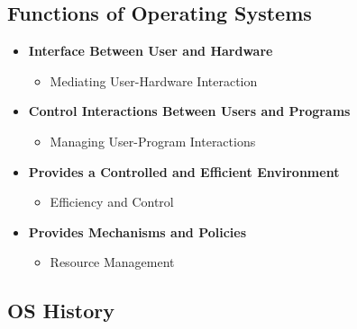 \documentclass[11pt]{article}
\theoremstyle{definition}
\begin{document}
\subsection{Functions of Operating Systems}
    \begin{itemize}
        \item \textbf{Interface Between User and Hardware}
        \begin{itemize}
            \item Mediating User-Hardware Interaction
        \end{itemize}

        \item \textbf{Control Interactions Between Users and Programs}
        \begin{itemize}
            \item Managing User-Program Interactions
        \end{itemize}

        \item \textbf{Provides a Controlled and Efficient Environment}
        \begin{itemize}
            \item Efficiency and Control
        \end{itemize}

        \item \textbf{Provides Mechanisms and Policies}
        \begin{itemize}
            \item Resource Management
        \end{itemize}
    \end{itemize}
\subsection{OS History}
\end{document}
